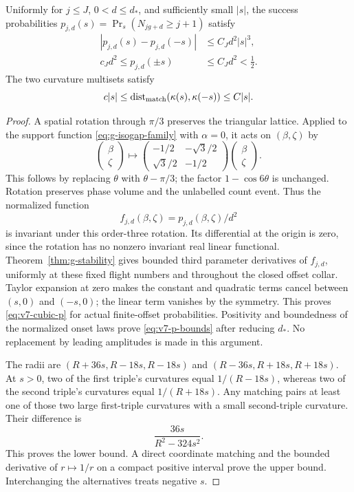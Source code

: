 \begin{lemma}
\label{lem:v7-cubic-count}
Uniformly for $j\le J$, $0<d\le d_*$, and sufficiently small $|s|$, the success probabilities $p_{j,d}(s)=\Pr_s(N_{jg+d}\ge j+1)$ satisfy
\begin{align}
 |p_{j,d}(s)-p_{j,d}(-s)|&\le C_Jd^2|s|^3,\label{eq:v7-cubic-p}\\
 c_Jd^2\le p_{j,d}(\pm s)&\le C_Jd^2<\tfrac12.\label{eq:v7-p-bounds}
\end{align}
The two curvature multisets satisfy
\begin{equation}\label{eq:v7-curvature-separation}
 c|s|\le\operatorname{dist}_{\rm match}(\kappa(s),\kappa(-s))\le C|s|.
\end{equation}
\end{lemma}
\begin{proof}
A spatial rotation through $\pi/3$ preserves the triangular lattice. Applied to the support function \eqref{eq:g-isogap-family} with $\alpha=0$, it acts on $(\beta,\zeta)$ by
\[
 \begin{pmatrix}\beta\\\zeta\end{pmatrix}\longmapsto
 \begin{pmatrix}-1/2&-\sqrt3/2\\ \sqrt3/2&-1/2\end{pmatrix}
 \begin{pmatrix}\beta\\\zeta\end{pmatrix}.
\]
This follows by replacing $\theta$ with $\theta-\pi/3$; the factor $1-\cos6\theta$ is unchanged. Rotation preserves phase volume and the unlabelled count event. Thus the normalized function
\[
                  f_{j,d}(\beta,\zeta)=p_{j,d}(\beta,\zeta)/d^2
\]
is invariant under this order-three rotation. Its differential at the origin is zero, since the rotation has no nonzero invariant real linear functional. Theorem~\ref{thm:g-stability} gives bounded third parameter derivatives of $f_{j,d}$, uniformly at these fixed flight numbers and throughout the closed offset collar. Taylor expansion at zero makes the constant and quadratic terms cancel between $(s,0)$ and $(-s,0)$; the linear term vanishes by the symmetry. This proves \eqref{eq:v7-cubic-p} for actual finite-offset probabilities. Positivity and boundedness of the normalized onset laws prove \eqref{eq:v7-p-bounds} after reducing $d_*$. No replacement by leading amplitudes is made in this argument.

The radii are $(R+36s,R-18s,R-18s)$ and $(R-36s,R+18s,R+18s)$. At $s>0$, two of the first triple's curvatures equal $1/(R-18s)$, whereas two of the second triple's curvatures equal $1/(R+18s)$. Any matching pairs at least one of those two large first-triple curvatures with a small second-triple curvature. Their difference is
\[
                     \frac{36s}{R^2-324s^2}.
\]
This proves the lower bound. A direct coordinate matching and the bounded derivative of $r\mapsto1/r$ on a compact positive interval prove the upper bound. Interchanging the alternatives treats negative $s$.
\end{proof}

